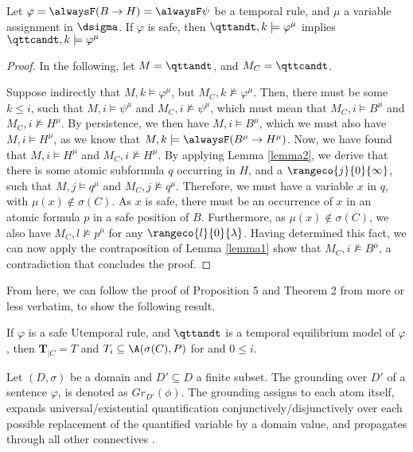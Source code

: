 \begin{lemma}
  Let $\varphi=\alwaysF (B \rightarrow H)=\alwaysF \psi$ be a temporal rule, and
  $\mu$ a variable assignment in $\dsigma$. If $\varphi$ is safe, then
  $\qttandt,k \models \varphi^\mu$ implies
  $\qttcandt,k \models \varphi^\mu$
\end{lemma}
\begin{proof}
  In the following, let $M=\qttandt$, and $M_C=\qttcandt$.

  Suppose indirectly that $M,k \models \varphi^\mu$, but
  $M_C,k \not \models \varphi^\mu$. Then, there must be some
  $k\leq i$, such that $M,i \models \psi^\mu$ and
  $M_C,i \not \models \psi^\mu$, which must mean that
  $M_C,i \models B^\mu$ and $M_C,i \not \models H^\mu$. By
  persistence, we then have $M,i \models B^\mu$, which we must also have $M,i \models H^\mu$, as we know that $M,k \models \alwaysF(B^\mu \rightarrow H^\mu)$. Now, we have found that $M,i \models H^\mu$ and $M_C,i \not \models H^\mu$. By applying Lemma \ref{lemma2}, we derive that there is some atomic subformula $q$ occurring in $H$, and a $\rangeco{j}{0}{\infty}$, such that $M,j \models q^\mu$ and $M_C,j \not \models q^\mu$. Therefore, we must have a variable $x$ in $q$, with $\mu(x) \not \in \sigma(C)$. As $x$ is safe, there must be an occurrence of $x$ in an atomic formula $p$ in a safe position of $B$. Furthermore, as $\mu(x) \not \in \sigma(C)$, we also have $M_C,l \not \models p^\mu$ for any $\rangeco{l}{0}{\lambda}$. Having determined this fact, we can now apply the contraposition of Lemma \ref{lemma1} show that $M_C,i \not \models B^\mu$, a contradiction that concludes the proof.
\end{proof}

From here, we can follow the proof of Proposition 5 and Theorem 2 from \cite{agcapevidi17a} more
or less verbatim, to show the following result.

\begin{theorem}
  If $\varphi$ is a safe Utemporal rule, and $\qttandt$ is a temporal equilibrium
  model of $\varphi$, then $\bm{T}_{|C}=T$ and $T_i \subseteq \A(\sigma(C),P)$ for and $0 \leq i$.
\end{theorem}

Let $(D,\sigma)$ be a domain and $D'\subseteq D$ a finite subset. The
grounding over $D'$ of a sentence $\varphi$, is denoted as
$Gr_{D'}(\phi)$. The grounding assigns to each atom itself, expands
universal/existential quantification conjunctively/disjunctively over
each possible replacement of the quantified variable by a domain
value, and propagates through all other connectives
\cite{agcapevidi17a}. 

